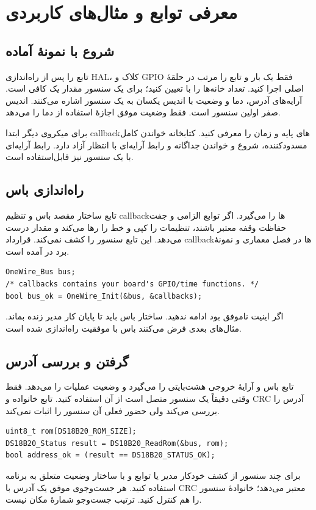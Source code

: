 \section{معرفی توابع و مثال‌های کاربردی}
\subsection{شروع با نمونهٔ آماده}
تابع
را پس از راه‌اندازی HAL، کلاک و GPIO فقط یک بار و تابع
را مرتب در حلقهٔ اصلی اجرا کنید. تعداد خانه‌ها را با
تعیین کنید؛ برای یک سنسور مقدار یک کافی است. آرایه‌های آدرس، دما و وضعیت با
اندیس یکسان به یک سنسور اشاره می‌کنند. اندیس صفر اولین سنسور است. فقط وضعیت
موفق اجازهٔ استفاده از دما را می‌دهد.

برای میکروی دیگر ابتدا callbackهای پایه و زمان را معرفی کنید. کتابخانه خواندن
کامل مسدودکننده، شروع و خواندن جداگانه و رابط آرایه‌ای با انتظار آزاد دارد.
رابط آرایه‌ای با یک سنسور نیز قابل‌استفاده است.

\subsection{راه‌اندازی باس}
تابع
ساختار مقصد باس و تنظیم callbackها را می‌گیرد. اگر توابع الزامی و جفت حفاظت
وقفه معتبر باشند، تنظیمات را کپی و خط را رها می‌کند و مقدار درست می‌دهد. این
تابع سنسور را کشف نمی‌کند. قرارداد callbackها در فصل معماری و نمونهٔ برد در
آمده است.
\begin{LTR}
\begin{lstlisting}
OneWire_Bus bus;
/* callbacks contains your board's GPIO/time functions. */
bool bus_ok = OneWire_Init(&bus, &callbacks);
\end{lstlisting}
\end{LTR}
اگر اینیت ناموفق بود ادامه ندهید. ساختار باس باید تا پایان کار مدیر زنده بماند.
مثال‌های بعدی فرض می‌کنند باس با موفقیت راه‌اندازی شده است.

\subsection{گرفتن و بررسی آدرس}
تابع
باس و آرایهٔ خروجی هشت‌بایتی را می‌گیرد و وضعیت عملیات را می‌دهد. فقط وقتی
دقیقاً یک سنسور متصل است از آن استفاده کنید. تابع
خانواده و CRC آدرس را بررسی می‌کند ولی حضور فعلی آن سنسور را اثبات نمی‌کند.
\begin{LTR}
\begin{lstlisting}
uint8_t rom[DS18B20_ROM_SIZE];
DS18B20_Status result = DS18B20_ReadRom(&bus, rom);
bool address_ok = (result == DS18B20_STATUS_OK);
\end{lstlisting}
\end{LTR}
برای چند سنسور از کشف خودکار مدیر یا توابع
و
با ساختار وضعیت متعلق به برنامه استفاده کنید. هر جست‌وجوی موفق یک آدرس با CRC
معتبر می‌دهد؛ خانوادهٔ سنسور را هم کنترل کنید. ترتیب جست‌وجو شمارهٔ مکان نیست.

